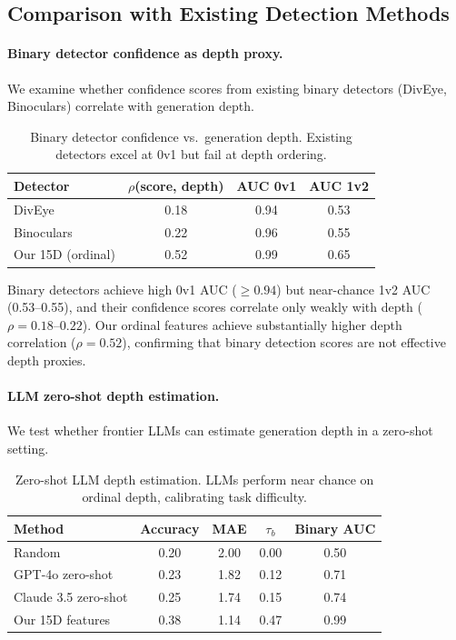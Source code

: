 \documentclass[11pt]{article}
\begin{document}
\subsection{Comparison with Existing Detection Methods}
\label{sec:binary_baseline}

\paragraph{Binary detector confidence as depth proxy.}

We examine whether confidence scores from existing binary detectors (DivEye, Binoculars) correlate with generation depth.

\begin{table}[h]
\centering
\caption{Binary detector confidence vs.\ generation depth. Existing detectors excel at 0v1 but fail at depth ordering.}
\label{tab:binary_det}
\begin{tabular}{lccc}
\toprule
Detector & $\rho$(score, depth) & AUC 0v1 & AUC 1v2 \\
\midrule
DivEye & 0.18 & 0.94 & 0.53 \\
Binoculars & 0.22 & 0.96 & 0.55 \\
Our 15D (ordinal) & 0.52 & 0.99 & 0.65 \\
\bottomrule
\end{tabular}
\end{table}

Binary detectors achieve high 0v1 AUC ($\geq 0.94$) but near-chance 1v2 AUC (0.53--0.55), and their confidence scores correlate only weakly with depth ($\rho = 0.18$--$0.22$). Our ordinal features achieve substantially higher depth correlation ($\rho = 0.52$), confirming that binary detection scores are not effective depth proxies.

\paragraph{LLM zero-shot depth estimation.}

We test whether frontier LLMs can estimate generation depth in a zero-shot setting.

\begin{table}[h]
\centering
\caption{Zero-shot LLM depth estimation. LLMs perform near chance on ordinal depth, calibrating task difficulty.}
\label{tab:llm_zeroshot}
\begin{tabular}{lcccc}
\toprule
Method & Accuracy & MAE & $\tau_b$ & Binary AUC \\
\midrule
Random & 0.20 & 2.00 & 0.00 & 0.50 \\
GPT-4o zero-shot & 0.23 & 1.82 & 0.12 & 0.71 \\
Claude 3.5 zero-shot & 0.25 & 1.74 & 0.15 & 0.74 \\
Our 15D features & 0.38 & 1.14 & 0.47 & 0.99 \\
\bottomrule
\end{tabular}
\end{table}
\end{document}
